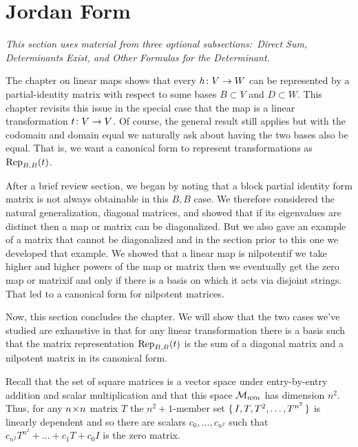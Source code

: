 \section{Jordan Form}
\noindent\textit{This section uses material from three optional
subsections:~Direct Sum, Determinants Exist, and
Other Formulas for the Determinant.}

The chapter on linear maps shows that every $\map{h}{V}{W}$ can
be represented by a partial-identity matrix with respect to some
bases $B\subset V$ and $D\subset W$. 
This chapter revisits this issue in the special case that the map is a
linear transformation $\map{t}{V}{V}$.
Of course, the general result still applies 
but with the codomain and domain equal
we naturally ask about having the two bases also be equal.
That is, we want a canonical form to represent transformations
as $\rep{t}{B,B}$.

After a brief review section, we began 
by noting that a block partial identity form matrix 
is not always obtainable in this $B,B$ case.
We therefore considered the natural generalization, diagonal matrices, and
showed that if its eigenvalues are distinct then
a map or matrix can be diagonalized.
But we also gave an example of a matrix that cannot be diagonalized and
in the section prior to this one we developed that example.
We showed that 
a linear map is nilpotent\Dash if we take higher and higher powers of the
map or matrix then we eventually get the zero map or matrix\Dash if and only 
if there is a basis on which it acts via disjoint strings.
That led to a canonical form for nilpotent matrices.

Now, this section concludes the chapter.
We will show that the two cases we've studied are exhaustive 
in that for any linear transformation there is
a basis such that the matrix representation $\rep{t}{B,B}$ is the sum of a 
diagonal matrix and a nilpotent matrix in its canonical form.









Recall that the set of square matrices
is a vector space under entry-by-entry addition and scalar multiplication and
that 
this space 
\( \matspace_{\nbyn{n}} \) has dimension \( n^2 \).
Thus, for any \( \nbyn{n} \) matrix $T$ the
\( n^2+1 \)-member set \( \set{I,T,T^2,\dots,T^{n^2} } \) is linearly
dependent and so there are scalars \( c_0,\dots,c_{n^2} \) such that
$c_{n^2}T^{n^2}+\dots+c_1T+c_0I$
is the zero matrix.

